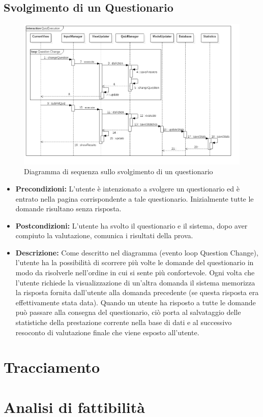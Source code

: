 \documentclass[a4paper,11pt]{article}
\begin{document}
	\subsection{Svolgimento di un Questionario}
	\begin{figure}[h!]
	\begin{center}
		\includegraphics[scale=0.5]{../images/QuizExecution.png}
		\caption{Diagramma di sequenza sullo svolgimento di un questionario}
	\end{center}
	\end{figure}
	\begin{itemize}
	\item\textbf{Precondizioni:} L'utente è intenzionato a svolgere un questionario ed è entrato nella pagina corrispondente a tale questionario. Inizialmente tutte le domande risultano senza risposta. \\ %
	\item\textbf{Postcondizioni:} L'utente ha svolto il questionario e il sistema, dopo aver compiuto la valutazione, comunica i risultati della prova.\\
	\item\textbf{Descrizione:} Come descritto nel diagramma (evento loop Question Change), l'utente ha la possibilità di scorrere più volte le domande del questionario in modo da risolverle nell'ordine in cui si sente più confortevole. Ogni volta che l'utente richiede la visualizzazione di un'altra domanda il sistema memorizza la risposta fornita dall'utente alla domanda precedente (se questa risposta era effettivamente stata data). Quando un utente ha risposto a tutte le domande può passare alla consegna del questionario, ciò porta al salvataggio delle statistiche della prestazione corrente nella base di dati e al successivo resoconto di valutazione finale che viene esposto all'utente.\\
	\end{itemize}
	\newpage
	\section{Tracciamento}
	\newpage
	\section{Analisi di fattibilità}
\end{document}
